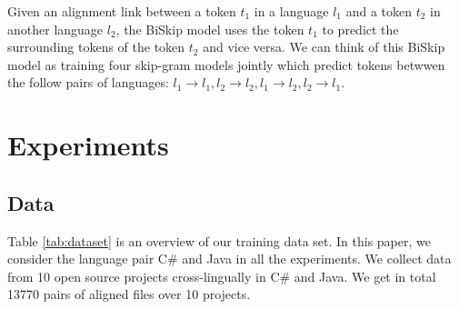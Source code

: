 Given an alignment link between a token $t_{1}$ in a language $l_{1}$ and a token $t_{2}$ in another language $l_{2}$, the BiSkip model uses the token $t_{1}$ to predict the surrounding tokens of the token $t_{2}$ and vice versa. We can think of this BiSkip model as training four skip-gram models jointly which predict tokens betwwen the follow pairs of languages: $l_{1} \rightarrow l_{1}, l_{2} \rightarrow l_{2}, l_{1} \rightarrow l_{2}, l_{2} \rightarrow l_{1}$.




\section{Experiments}


\subsection{Data}

Table \ref{tab:dataset} is an overview of our training data set. In this paper, we consider the language pair C\# and Java in all the experiments. We collect data from 10 open source projects cross-lingually in C\# and Java. We get in total 13770 pairs of aligned files over 10 projects. 

